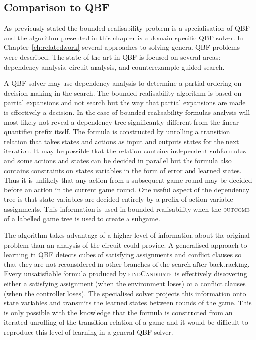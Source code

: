 \subsection{Comparison to QBF}

As previously stated the bounded realisability problem is a specialisation of QBF and the algorithm presented in this chapter is a domain specific QBF solver. In Chapter~\ref{ch:relatedwork} several approaches to solving general QBF problems were described. The state of the art in QBF is focused on several areas: dependency analysis, circuit analysis, and counterexample guided search. 

A QBF solver may use dependency analysis to determine a partial ordering on decision making in the search. The bounded realisability algorithm is based on partial expansions and not search but the way that partial expansions are made is effectively a decision. In the case of bounded realisability formulas analysis will most likely not reveal a dependency tree significantly different from the linear quantifier prefix itself. The formula is constructed by unrolling a transition relation that takes states and actions as input and outputs states for the next iteration. It may be possible that the relation contains independent subformulas and some actions and states can be decided in parallel but the formula also contains constraints on states variables in the form of error and learned states. Thus it is unlikely that any action from a subsequent game round may be decided before an action in the current game round. One useful aspect of the dependency tree is that state variables are decided entirely by a prefix of action variable assignments. This information is used in bounded realisability when the \textsc{outcome} of a labelled game tree is used to create a subgame. 

The algorithm takes advantage of a higher level of information about the original problem than an analysis of the circuit could provide. A generalised approach to learning in QBF detects cubes of satisfying assignments and conflict clauses so that they are not reconsidered in other branches of the search after backtracking. Every unsatisfiable formula produced by \textsc{findCandidate} is effectively discovering either a satisfying assignment (when the environment loses) or a conflict clauses (when the controller loses). The specialised solver projects this information onto state variables and transmits the learned states between rounds of the game. This is only possible with the knowledge that the formula is constructed from an iterated unrolling of the transition relation of a game and it would be difficult to reproduce this level of learning in a general QBF solver.

